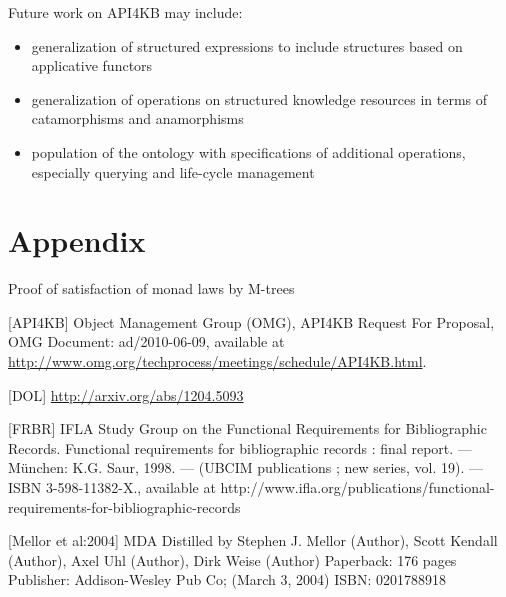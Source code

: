 \documentclass[runningheads]{llncs}
\begin{document}
Future work on API4KB may include:
\begin{itemize}
\item generalization of structured expressions to include structures based on applicative functors
\item generalization of operations on structured knowledge resources in terms of catamorphisms and anamorphisms
\item population of the ontology with specifications of additional operations, especially querying and life-cycle management
\end{itemize}

\section{Appendix}

Proof of satisfaction of monad laws by M-trees








%
%



[API4KB] Object Management Group (OMG), API4KB Request For Proposal, OMG Document: ad/2010-06-09, available at
\url {http://www.omg.org/techprocess/meetings/schedule/API4KB.html}.

[DOL] 
\url{ http://arxiv.org/abs/1204.5093 }

[FRBR] IFLA Study Group on the Functional Requirements for Bibliographic Records. Functional requirements for bibliographic records : final report. — München: K.G. Saur, 1998. — (UBCIM publications ; new series, vol. 19). — ISBN 3-598-11382-X., available at http://www.ifla.org/publications/functional-requirements-for-bibliographic-records

[Mellor et al:2004] MDA Distilled
by Stephen J. Mellor (Author), Scott Kendall (Author), Axel Uhl (Author), Dirk Weise (Author)
Paperback: 176 pages
Publisher: Addison-Wesley Pub Co; (March 3, 2004)
ISBN: 0201788918
\end{document}
